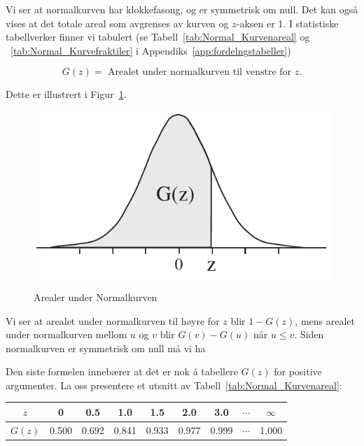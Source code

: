 \noindent Vi ser at normalkurven har klokkefasong, og er symmetrisk
om null. Det kan også vises at det totale areal som avgrenses av
kurven og $z$-aksen er 1. I statistiske tabellverker finner vi
tabulert (se Tabell~\ref{tab:Normal_Kurvenareal} og ~\ref{tab:Normal_Kurvefraktiler} i Appendiks~\ref{app:fordelngstabeller})

\[ G(z) =  \mbox{\ Arealet under normalkurven til venstre for $z$.} \]

Dette er illustrert i Figur~\ref{fig:arealet_under}.

\begin{figure}[ht]
\centering
	\includegraphics[scale=1.0]{figurer/fig6_2.pdf} 
\caption{Arealer under Normalkurven}
	\label{fig:arealet_under}
\end{figure}

\noindent Vi ser at arealet under normalkurven til høyre for $z$ blir $1 -
G(z)$, mens arealet under normalkurven mellom $u$ og $v$ blir
$G(v) - G(u)$ når $u\leq v$. Siden normalkurven er symmetrisk om
null må vi ha 
\begin{center} \framebox[10cm]{\begin{minipage}{9cm}
\[ \mbox{\ \ \ G1. \ \ \ \ } G(-z)=1-G(z) \]
\mbox{}\vspace{-0.5\belowdisplayskip}
  \end{minipage}} \end{center}
Den siste formelen innebærer at det er nok å tabellere $G(z)$ for
positive argumenter. La oss presentere et utsnitt av Tabell~\ref{tab:Normal_Kurvenareal}:

\begin{center}
\begin{tabular}{c|cccccccc}
  $z$ &  0  & 0.5 & 1.0 & 1.5 & 2.0 & 3.0 &$\cdots$& $\infty$ \\ \hline
$G(z)$&0.500&0.692&0.841&0.933&0.977&0.999&$\cdots$&1.000
\end{tabular}
\end{center}


